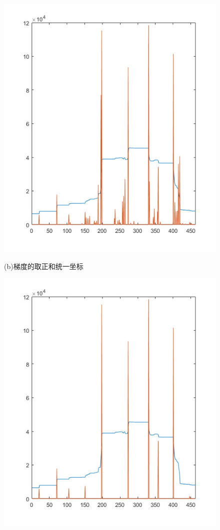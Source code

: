 \begin{figure}[!h]
\begin{minipage}[t]{0.32\linewidth}
        \includegraphics[width=\textwidth]{./figures/c4_unified.jpg}
        \centerline{\small (b)梯度的取正和统一坐标}
        \end{minipage}
        \begin{minipage}[t]{0.32\linewidth}
        \centering
        \includegraphics[width=\textwidth]{./figures/c4_nms.jpg}

\end{minipage}
\end{figure}
